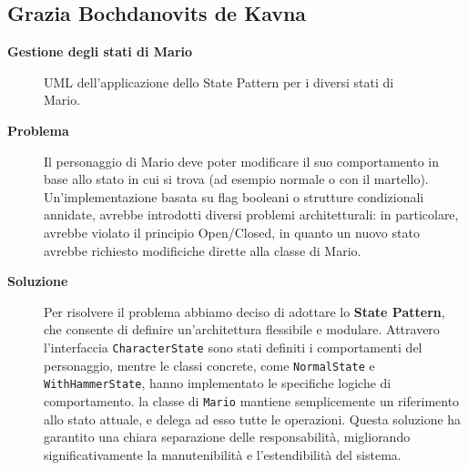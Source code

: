 \documentclass[a4paper,12pt]{report}
\begin{document}
\subsection{Grazia Bochdanovits de Kavna}
\textbf{Gestione degli stati di Mario}
\begin{figure}[H]
	\centering{}
	
	\caption{UML dell'applicazione dello State Pattern per i diversi stati di Mario.}
	\label{img:MarioState}
\end{figure}
\begin{description}
	\item[\textbf{Problema}]
	      Il personaggio di Mario deve poter modificare il suo comportamento in base allo stato in cui si trova (ad esempio normale o con il martello).
		  Un'implementazione basata su flag booleani o strutture condizionali annidate, avrebbe introdotti diversi problemi architetturali: in particolare,
		  avrebbe violato il principio Open/Closed, in quanto un nuovo stato avrebbe richiesto modificiche dirette alla classe di Mario.

	\item[\textbf{Soluzione}]
	      Per risolvere il problema abbiamo deciso di adottare lo \textbf{State Pattern}, che consente di definire un'architettura flessibile e modulare. Attravero l'interfaccia \texttt{CharacterState} sono stati
	      definiti i comportamenti del personaggio, mentre le classi concrete, come \texttt{NormalState} e \texttt{WithHammerState}, hanno implementato le specifiche logiche di comportamento.
	      la classe di \texttt{Mario} mantiene semplicemente un riferimento allo stato attuale, e delega ad esso tutte le operazioni.
		  Questa soluzione ha garantito una chiara separazione delle responsabilità, migliorando significativamente la manutenibilità e l'estendibilità del sistema.
\end{description}
\end{document}
